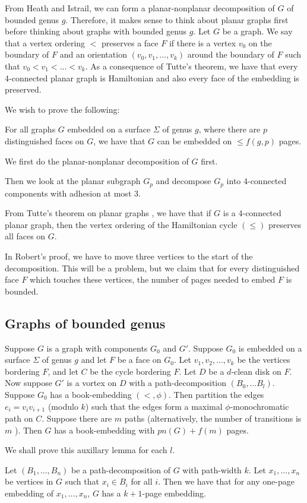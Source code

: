 From Heath and Istrail, we can form a planar-nonplanar decomposition of $G$ of bounded genus $g$. Therefore, it makes sense to think about planar graphs first before thinking about graphs with bounded genus $g$.
Let $G$ be a graph. We say that a vertex ordering $<$ preserves a face $F$ if there is a vertex $v_0$ on the boundary of $F$ and an orientation $(v_0, v_1, ..., v_k)$ around the boundary of $F$ such that $v_0 < v_1 < ... < v_k$. 
As a consequence of Tutte's theorem, we have that every 4-connected planar graph is Hamiltonian and also every face of the embedding is preserved. 

We wish to prove the following:

\begin{conjecture}\label{conj:4-planar graphs}
	For all graphs $G$ embedded on a surface $\Sigma$ of genus $g$, where there are $p$ distinguished faces on $G$, we have that $G$ can be embedded on $\leq f(g, p)$ pages.
\end{conjecture}

We first do the planar-nonplanar decomposition of $G$ first. 

Then we look at the planar subgraph $G_p$ and decompose $G_p$ into 4-connected components with adhesion at most 3.

From Tutte's theorem on planar graphs \cite{tutteTheoremPlanarGraphs1956}, we have that if $G$ is a 4-connected planar graph, then the vertex ordering of the Hamiltonian cycle $(\leq)$ preserves all faces on $G$.

In Robert's proof, we have to move three vertices to the start of the decomposition. This will be a problem, but we claim that for every distinguished face $F$ which touches these vertices, the number of pages needed to embed $F$ is bounded. 

\subsection{Graphs of bounded genus}

\begin{lemma}
	Suppose $G$ is a graph with components $G_0$ and $G'$. Suppose $G_0$ is embedded on a surface $\Sigma$ of genus $g$ and let $F$ be a face on $G_0$. Let $v_1, v_2, ..., v_k$ be the vertices bordering $F$, and let $C$ be the cycle bordering $F$. Let $D$ be a $d$-clean disk on $F$. Now suppose $G'$ is a vortex on $D$ with a path-decomposition $(B_0, ... B_l)$. Suppose $G_0$ has a book-embedding $(<, \phi)$. Then partition the edges $e_i = v_i v_{i + 1}$ (modulo $k$) such that the edges form a maximal $\phi$-monochromatic path on $C$. Suppose there are $m$ paths (alternatively, the number of transitions is $m$ ). Then $G$ has a book-embedding with $pn(G) + f(m)$ pages.
\end{lemma}
We shall prove this auxillary lemma for each $l$. 
\begin{lemma}
	Let $(B_1, ..., B_n)$ be a path-decomposition of $G$ with path-width $k$. Let $x_1, ..., x_n$ be vertices in $G$ such that $x_i \in B_i$ for all $i$. Then we have that for any one-page embedding of $x_1, ..., x_n$, $G$ has a $k + 1$-page embedding. 
\end{lemma}

